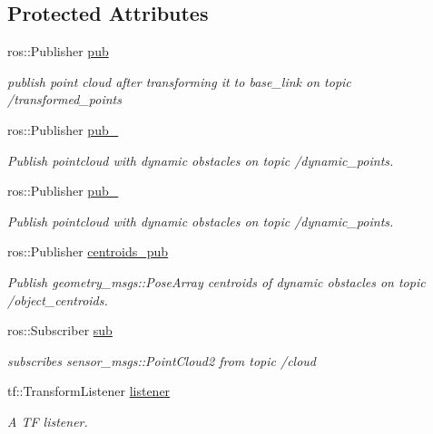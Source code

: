 \subsection*{Protected Attributes}
\begin{DoxyCompactItemize}
\item 
ros\+::\+Publisher \hyperlink{classdatmo_1_1cloud__segmentation_a01955e35ed0d12b9da4d4d9afb1007e3}{pub}
\begin{DoxyCompactList}\small\item\em publish point cloud after transforming it to base\+\_\+link on topic /transformed\+\_\+points \end{DoxyCompactList}\item 
ros\+::\+Publisher \hyperlink{classdatmo_1_1cloud__segmentation_a0e1bf18752add68fc2df89e212750d91}{pub\+\_}
\begin{DoxyCompactList}\small\item\em Publish pointcloud with dynamic obstacles on topic /dynamic\+\_\+points. \end{DoxyCompactList}\item 
ros\+::\+Publisher \hyperlink{classdatmo_1_1cloud__segmentation_ac80cc51227bec21bcac68f80a9b4fc47}{pub\+\_}
\begin{DoxyCompactList}\small\item\em Publish pointcloud with dynamic obstacles on topic /dynamic\+\_\+points. \end{DoxyCompactList}\item 
ros\+::\+Publisher \hyperlink{classdatmo_1_1cloud__segmentation_a287579b3989262f060341ebca1ed53b2}{centroids\+\_\+pub}
\begin{DoxyCompactList}\small\item\em Publish geometry\+\_\+msgs\+::\+Pose\+Array centroids of dynamic obstacles on topic /object\+\_\+centroids. \end{DoxyCompactList}\item 
ros\+::\+Subscriber \hyperlink{classdatmo_1_1cloud__segmentation_a72e340852b66e150cb7f0e25214b7439}{sub}
\begin{DoxyCompactList}\small\item\em subscribes sensor\+\_\+msgs\+::\+Point\+Cloud2 from topic /cloud \end{DoxyCompactList}\item 
tf\+::\+Transform\+Listener \hyperlink{classdatmo_1_1cloud__segmentation_abf9b807df25f63ea330b165a9f2e4be1}{listener}
\begin{DoxyCompactList}\small\item\em A TF listener. \end{DoxyCompactList}\item 

\end{DoxyCompactItemize}
